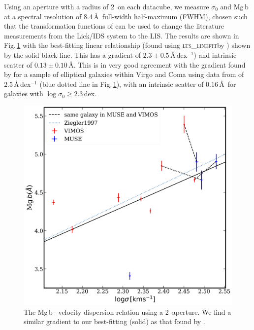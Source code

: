 \documentclass[a4paper,fleqn,usenatbib]{mnras}
\begin{document}
		Using an aperture with a radius of 2\arcsec\ on each datacube, we measure $\sigma_0$ and Mg\,b at a spectral resolution of 8.4\,\AA\ full-width half-maximum (FWHM), chosen such that the transformation functions of \citet{Vazdekis2010} can be used to change the literature measurements from the Lick/IDS system to the LIS. The results are shown in Fig.\,\ref{fig:globalMg} with the best-fitting linear relationship (found using \textsc{lts\_linefit}\footnotemark[\ref{Cappellari}] by \citealt{Cappellari2013}) shown by the solid black line. This has a gradient of $2.3 \pm 0.5 \,\mathrm{\text{\AA}\,dex^{-1}}$) and intrinsic scatter of $0.13 \pm 0.10 \,$\AA. %
		This is in very good agreement with the gradient found by \citet{Ziegler1997} for a sample of elliptical galaxies within Virgo and Coma using data from \citet{Dressler1987} of $2.5\,\mathrm{\text{\AA}\,dex^{-1}}$ (blue dotted line in Fig.\,\ref{fig:globalMg}), with an intrinsic scatter of 0.16\,\AA\ for galaxies with $\log \sigma_0 \geqslant 2.3$\,dex.

		\begin{figure}
			\includegraphics[width=\columnwidth]{Mg_sigma.png}
			\caption[Global Mg\,b\,--\,$\sigma$]{The Mg\,b\,--\,velocity dispersion relation using a 2\arcsec\ aperture. We find a similar gradient to our best-fitting (solid) as that found by \citet[; dotted line]{Ziegler1997}.}
			\label{fig:globalMg}
		\end{figure}
\end{document}
